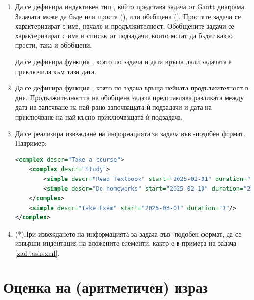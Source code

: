 \begin{enumerate}[]
	\item Да се дефинира индуктивен тип , който представя задача от Gantt диаграма. Задачата може да бъде или проста (), или обобщена (). Простите задачи се характеризират с име, начало и продължителност. Обобщените задачи се характеризират с име и списък от подзадачи, които могат да бъдат както прости, така и обобщени. 
	
	Да се дефинира функция , която по задача и дата връща дали задачата е приключила към тази дата. 

	\item Да се дефинира функция , която по задача връща нейната продължителност в дни. Продължителността на обобщена задача представлява разликата между дата на започване на най-рано започващата ѝ подзадачи и дата на приключване на най-късно приключващата ѝ подзадача. 
	
	\item \label{zad:tasksxml} Да се реализира извеждане на информацията за задача във -подобен формат. Например:
\begin{lstlisting}[basicstyle=\tiny,language=xml]
<complex descr="Take a course">
	<complex descr="Study">
		<simple descr="Read Textbook" start="2025-02-01" duration="20"/>
		<simple descr="Do homeworks" start="2025-02-10" duration="20"/>
	</complex>
	<simple descr="Take Exam" start="2025-03-01" duration="1"/>
</complex>
\end{lstlisting}

	\item(*)При извеждането на информацията за задача във -подобен формат, да се извърши индентация на вложените елементи, както е в примера на задача \ref{zad:tasksxml}.
	

\end{enumerate}


\section{Оценка на (аритметичен) израз}


